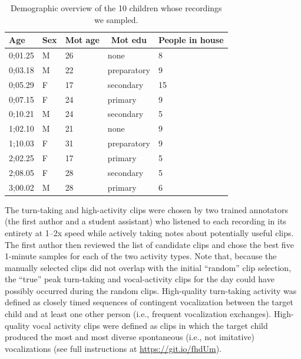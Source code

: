 \documentclass[floatsintext,man]{apa6}
\theoremstyle{definition}
\theoremstyle{definition}
\theoremstyle{definition}
\theoremstyle{remark}
\begin{document}
\begin{table}[tbp]
\begin{center}
\begin{threeparttable}
\caption{\label{tab:tab1}Demographic overview of the 10 children whose recordings we sampled.}
\begin{tabular}{lllll}
\toprule
Age & \multicolumn{1}{c}{Sex} & \multicolumn{1}{c}{Mot age} & \multicolumn{1}{c}{Mot edu} & \multicolumn{1}{c}{People in house}\\
\midrule
0;01.25 & M & 26 & none & 8\\
0;03.18 & M & 22 & preparatory & 9\\
0;05.29 & F & 17 & secondary & 15\\
0;07.15 & F & 24 & primary & 9\\
0;10.21 & M & 24 & secondary & 5\\
1;02.10 & M & 21 & none & 9\\
1;10.03 & F & 31 & preparatory & 9\\
2;02.25 & F & 17 & primary & 5\\
2;08.05 & F & 28 & secondary & 5\\
3;00.02 & M & 28 & primary & 6\\
\bottomrule
\end{tabular}
\end{threeparttable}
\end{center}
\end{table}

The turn-taking and high-activity clips were chosen by two trained
annotators (the first author and a student assistant) who listened to
each recording in its entirety at 1--2x speed while actively taking
notes about potentially useful clips. The first author then reviewed the
list of candidate clips and chose the best five 1-minute samples for
each of the two activity types. Note that, because the manually selected
clips did not overlap with the initial \enquote{random} clip selection,
the \enquote{true} peak turn-taking and vocal-activity clips for the day
could have possibly occurred during the random clips. High-quality
turn-taking activity was defined as closely timed sequences of
contingent vocalization between the target child and at least one other
person (i.e., frequent vocalization exchanges). High-quality vocal
activity clips were defined as clips in which the target child produced
the most and most diverse spontaneous (i.e., not imitative)
vocalizations (see full instructions at \url{https://git.io/fhdUm}).
\end{document}
